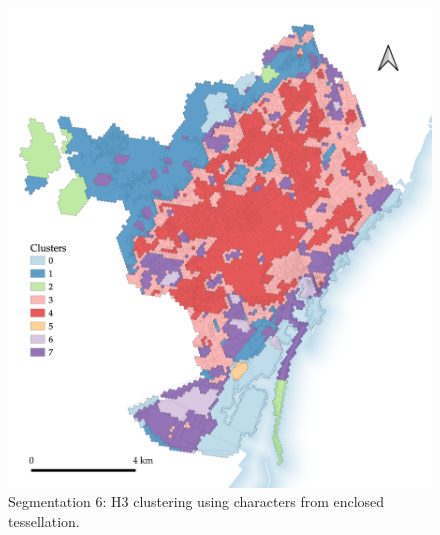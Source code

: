 \documentclass[a4paper, nobind]{templates/ociamthesis}
\begin{document}
\begin{figure}

{\centering \includegraphics[width=.8\paperwidth]{figures/maps/H3_ET_chars 1} 

}

\caption[Segmentation 6: H3 clustering using ET characters.]{Segmentation 6: H3 clustering using characters from enclosed tessellation.}\label{fig:H3-ET-chars-map-BCN}
\end{figure}
\end{document}

